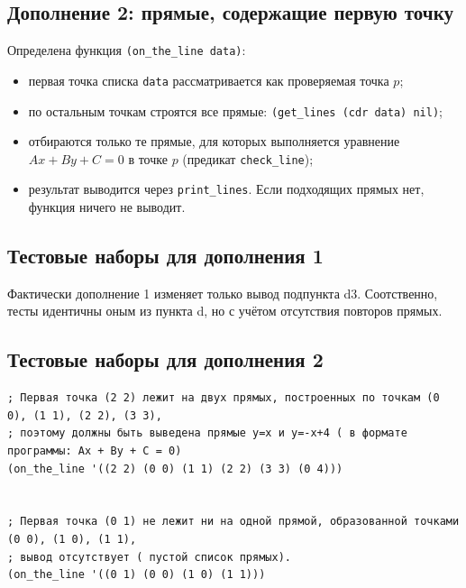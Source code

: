 \documentclass[a4paper, 11pt]{article}
\begin{document}
\subsection*{Дополнение 2: прямые, содержащие первую точку}
Определена функция \texttt{(on\_the\_line data)}:
\begin{itemize}
  \item первая точка списка \texttt{data} рассматривается как проверяемая точка $p$;
  \item по остальным точкам строятся все прямые: \texttt{(get\_lines (cdr data) nil)};
  \item отбираются только те прямые, для которых выполняется уравнение
        $Ax + By + C = 0$ в точке $p$ (предикат \texttt{check\_line});
  \item результат выводится через \texttt{print\_lines}. Если подходящих прямых нет, функция ничего не выводит.
\end{itemize}

\subsection*{Тестовые наборы для дополнения 1}
Фактически дополнение 1 изменяет только вывод подпункта d3. Соотственно, тесты идентичны оным из пункта d, но с учётом отсутствия повторов прямых.

\subsection*{Тестовые наборы для дополнения 2}
\begin{lstlisting}
; Первая точка (2 2) лежит на двух прямых, построенных по точкам (0 0), (1 1), (2 2), (3 3),
; поэтому должны быть выведена прямые y=x и y=-x+4 ( в формате программы: Ax + By + C = 0)
(on_the_line '((2 2) (0 0) (1 1) (2 2) (3 3) (0 4)))


; Первая точка (0 1) не лежит ни на одной прямой, образованной точками (0 0), (1 0), (1 1),
; вывод отсутствует ( пустой список прямых).
(on_the_line '((0 1) (0 0) (1 0) (1 1)))
\end{lstlisting}
\end{document}
